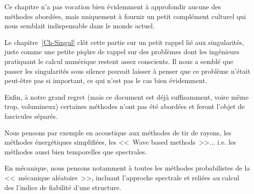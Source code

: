 Ce chapitre n'a pas vocation bien évidemment à approfondir aucune des méthodes
abordées, mais uniquement à fournir un petit complément culturel qui nous semblait
indispensable dans le monde actuel.

\medskip
Le chapitre~\ref{Ch-Singul} clôt cette partie sur un petit rappel lié aux singularités,
juste comme une petite piqûre de rappel sur des problèmes dont les ingénieurs pratiquant
le calcul numérique restent assez conscients. Il nous a semblé que passer les singularités
sous silence pouvait laisser à penser que ce problème n'était peut-être pas si
important, ce qui n'est pas le cas bien évidemment.


\medskip
Enfin, à notre grand regret (mais ce document est déjà suffisamment, voire même trop,
volumineux) certaines méthodes n'ont pas été abordées et feront l'objet de fascicules
séparés.

Nous pensons par exemple en acoustique aux méthodes de tir de rayons, les méthodes
énergétiques simplifiées, les <<~Wave based methods~>>... i.e. les méthodes aussi bien
temporelles que spectrales.

En mécanique, nous pensons notamment à toutes les méthodes probabilistes de la
<<~mécanique aléatoire~>>, incluant l'approche spectrale et reliées au calcul des
l'indice de fiabilité d'une structure.


